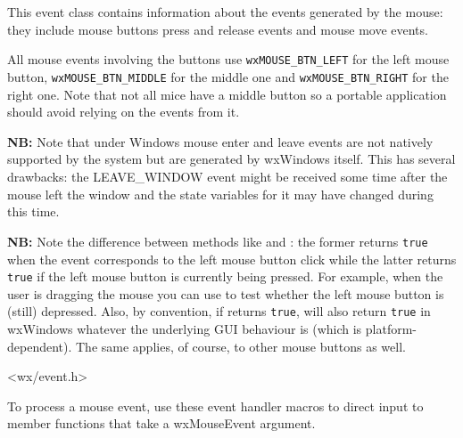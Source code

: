 \section{}\label{wxmouseevent}

This event class contains information about the events generated by the mouse:
they include mouse buttons press and release events and mouse move events.

All mouse events involving the buttons use {\tt wxMOUSE\_BTN\_LEFT} for the
left mouse button, {\tt wxMOUSE\_BTN\_MIDDLE} for the middle one and
{\tt wxMOUSE\_BTN\_RIGHT} for the right one. Note that not all mice have a
middle button so a portable application should avoid relying on the events from
it.

{\bf NB:} Note that under Windows mouse enter and leave events are not natively supported
by the system but are generated by wxWindows itself. This has several
drawbacks: the LEAVE\_WINDOW event might be received some time after the mouse
left the window and the state variables for it may have changed during this
time.

{\bf NB:} Note the difference between methods like
 and
: the former returns {\tt true}
when the event corresponds to the left mouse button click while the latter
returns {\tt true} if the left mouse button is currently being pressed. For
example, when the user is dragging the mouse you can use
 to test
whether the left mouse button is (still) depressed. Also, by convention, if
 returns {\tt true},
 will also return {\tt true} in
wxWindows whatever the underlying GUI behaviour is (which is
platform-dependent). The same applies, of course, to other mouse buttons as
well.




<wx/event.h>


To process a mouse event, use these event handler macros to direct input to member
functions that take a wxMouseEvent argument.

